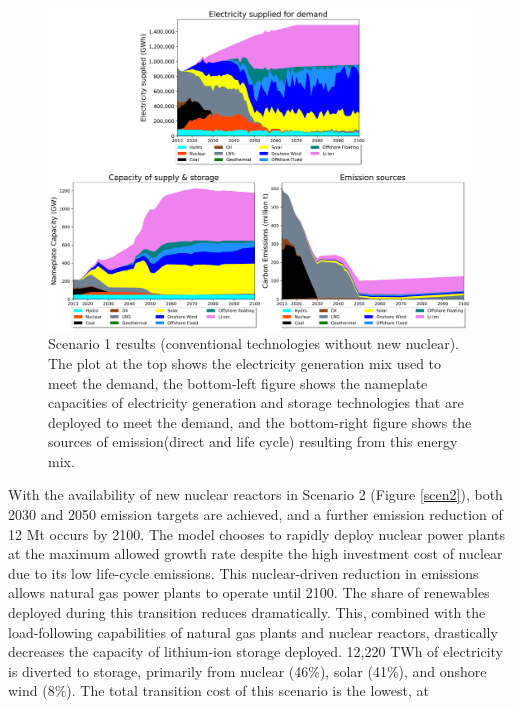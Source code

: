 \begin{figure}[H] 
\centering
\includegraphics[scale=0.5]{figures/conv_nonuc}
\caption{Scenario 1 results (conventional technologies without new nuclear). The plot at the top shows the electricity generation mix used to meet the demand, the bottom-left figure shows the nameplate capacities of electricity generation and storage technologies that are deployed to meet the demand, and the bottom-right figure shows the sources of emission(direct and life cycle) resulting from this energy mix.}
\label{scen1}
\end{figure}

With the availability of new nuclear reactors in Scenario 2 (Figure \ref{scen2}), both 2030 and 2050 emission targets are achieved, and a further emission reduction of 12 Mt occurs by 2100. The model chooses to rapidly deploy nuclear power plants at the maximum allowed growth rate despite the high investment cost of nuclear due to its low life-cycle emissions. This nuclear-driven reduction in emissions allows natural gas power plants to operate until 2100. The share of renewables deployed during this transition reduces dramatically. This, combined with the load-following capabilities of natural gas plants and nuclear reactors, drastically decreases the capacity of lithium-ion storage deployed. 12,220 TWh of electricity is diverted to storage, primarily from nuclear (46\%), solar (41\%), and onshore wind (8\%). The total transition cost of this scenario is the lowest, at   

